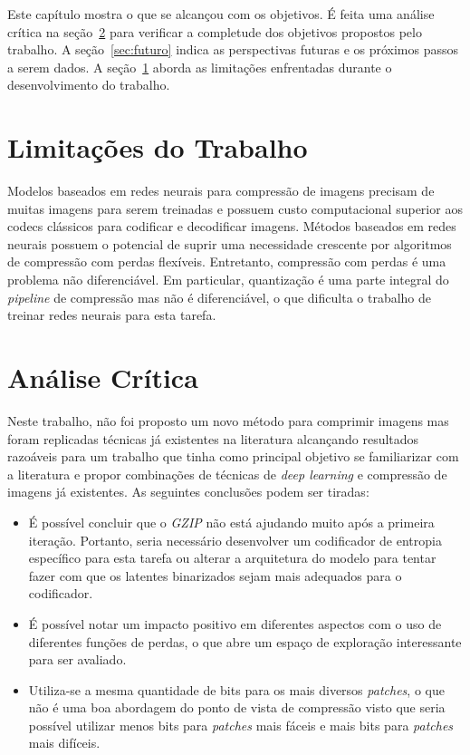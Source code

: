 Este capítulo mostra o que se alcançou com os objetivos. É feita uma análise crítica na seção~\ref{sec:analise} para verificar a completude dos objetivos propostos pelo trabalho. A seção~\ref{sec:futuro} indica as perspectivas futuras e os próximos passos a serem dados. A seção~\ref{sec:limitacoes} aborda as limitações enfrentadas durante o desenvolvimento do trabalho.

\section{Limitações do Trabalho}
\label{sec:limitacoes}
Modelos baseados em redes neurais para compressão de imagens precisam de muitas imagens para serem treinadas e possuem custo computacional superior aos codecs clássicos para codificar e decodificar imagens. Métodos baseados em redes neurais possuem o potencial de suprir uma necessidade crescente por algoritmos de compressão com perdas flexíveis. Entretanto, compressão com perdas é uma problema não diferenciável. Em particular, quantização é uma parte integral do \textit{pipeline} de compressão mas não é diferenciável, o que dificulta o trabalho de treinar redes neurais para esta tarefa.
\section{Análise Crítica}
\label{sec:analise}
Neste trabalho, não foi proposto um novo método para comprimir imagens mas foram replicadas técnicas já existentes na literatura alcançando resultados razoáveis para um trabalho que tinha como principal objetivo se familiarizar com a literatura e propor combinações de técnicas de \textit{deep learning} e compressão de imagens já existentes. As seguintes conclusões podem ser tiradas:
\begin{itemize}
    \item É possível concluir que o \textit{GZIP} não está ajudando muito após a primeira iteração. Portanto, seria necessário desenvolver um codificador de entropia específico para esta tarefa ou alterar a arquitetura do modelo para tentar fazer com que os latentes binarizados sejam mais adequados para o codificador.
    \item É possível notar um impacto positivo em diferentes aspectos com o uso de diferentes funções de perdas, o que abre um espaço de exploração interessante para ser avaliado.
    \item Utiliza-se a mesma quantidade de bits para os mais diversos \textit{patches}, o que não é uma boa abordagem do ponto de vista de compressão visto que seria possível utilizar menos bits para \textit{patches} mais fáceis e mais bits para \textit{patches} mais difíceis. 
\end{itemize}


